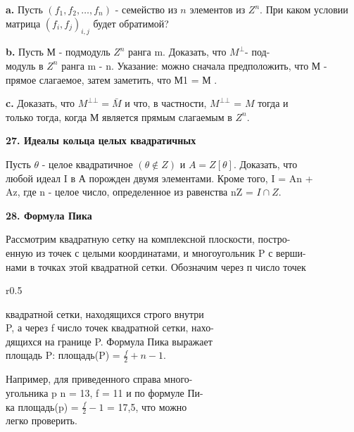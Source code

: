 \documentclass{../template/mai_book}
\begin{document}
{\bf a.} Пусть $( f_1,f_2,\ldots,f_n )$ - семейство из $n$ элементов из $Z^n$. При 
каком условии матрица $(f_i,f_j)_{i,j}$ будет обратимой? 

\medskip

{\bf b.} Пусть М - подмодуль $Z^n$ ранга m. Доказать, что $M^{\bot}$- 
под-\\модуль в $Z^n$ ранга m - n. Указание: можно сначала предположить, что 
М - прямое слагаемое, затем заметить, что М1 = М . 

\medskip

{\bf c.} Доказать, что  $M^{\bot\bot} = \bar{M}$ и что, в частности,  $M^{\bot\bot}$ =  $M$ тогда и\\
только тогда, когда М является прямым слагаемым в $Z^n$. 

\medskip

{\noindent\bf27. Идеалы кольца целых квадратичных} 

\medskip

Пусть $\theta$ - целое квадратичное $(\theta\notin Z)$ и $A = Z[\theta] $. Доказать, что\\
любой идеал I в А порожден двумя элементами. Кроме того, I = An +\\ 
Az, где n - целое число, определенное из равенства nZ = $I\cap Z$. 

\medskip

{\noindent\bf28. Формула Пика} 

\medskip

Рассмотрим квадратную сетку на комплексной плоскости, 
постро-\\енную из точек с целыми координатами, и многоугольник P с 
верши-\\нами в точках этой квадратной сетки. Обозначим через п число точек

\pagebreak

\begin{wrapfigure}{r}{0.5\textwidth}
\end{wrapfigure}

квадратной сетки, находящихся строго внутри\\ 
P, а через f число точек квадратной сетки, 
нахо-\\дящихся на границе P. Формула Пика выражает\\ 
площадь P: площадь(P) = $\frac{f}{2} + n - 1$. 

Например, для приведенного справа 
много-\\угольника p n = 13, f = 11 и по формуле 
Пи-\\ка площадь(p) = $\frac{f}{2} - 1$ = 17,5, что можно\\ 
легко проверить. 
\end{document}
